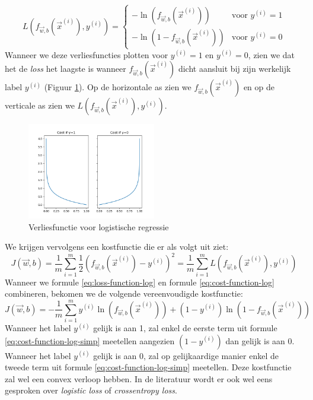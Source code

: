 \begin{equation}
 	L(f_{\vec{w},b}(\vec{x}^{(i)}), y^{(i)}) = \left\{ \begin{matrix} -\ln(f_{\vec{w},b}(\vec{x}^{(i)})) & \mbox{voor } y^{(i)} = 1 \\ -\ln(1 - f_{\vec{w},b}(\vec{x}^{(i)}))  & \mbox{voor } y^{(i)} = 0 \end{matrix}\right .
 	\label{eq:loss-function-log}
 \end{equation}
\noindent
Wanneer we deze verliesfuncties plotten voor $y^{(i)} = 1$ en $y^{(i)} = 0$, zien we dat het de \textit{loss} het laagste is wanneer $f_{\vec{w},b}(\vec{x}^{(i)})$ dicht aansluit bij zijn werkelijk label $y^{(i)}$ (Figuur \ref{fig:loss-function-log}). Op de horizontale as zien we $f_{\vec{w},b}(\vec{x}^{(i)})$ en op de verticale as zien we $L(f_{\vec{w},b}(\vec{x}^{(i)}), y^{(i)})$.

\begin{figure}[h]
	\centering
	\includegraphics[width=0.5\textwidth]{images/10-loss-function-log.png}
	\caption{Verliesfunctie voor logistische regressie}
	\label{fig:loss-function-log}
\end{figure}
\noindent
We krijgen vervolgens een kostfunctie die er als volgt uit ziet:
\begin{equation}
	J(\vec{w}, b) = \frac{1}{m} \sum_{i=1}^{m} \frac{1}{2}(f_{\vec{w},b}(\vec{x}^{(i)}) - y^{(i)})^{2} = \frac{1}{m} \sum_{i=1}^{m} L(f_{\vec{w},b}(\vec{x}^{(i)}), y^{(i)})
	\label{eq:cost-function-log}
\end{equation}
\noindent
Wanneer we formule \ref{eq:loss-function-log} en formule \ref{eq:cost-function-log} combineren, bekomen we de volgende vereenvoudigde kostfunctie:
\begin{equation}
	J(\vec{w}, b) = -\frac{1}{m} \sum_{i=1}^{m} y^{(i)}\ln(f_{\vec{w},b}(\vec{x}^{(i)})) + (1 - y^{(i)}) \ln(1 - f_{\vec{w},b}(\vec{x}^{(i)})) 
	\label{eq:cost-function-log-simp}
\end{equation}
\noindent
Wanneer het label $y^{(i)}$ gelijk is aan 1, zal enkel de eerste term uit formule \ref{eq:cost-function-log-simp} meetellen aangezien $(1 - y^{(i)})$ dan gelijk is aan 0. Wanneer het label $y^{(i)}$ gelijk is aan 0, zal op gelijkaardige manier enkel de tweede term uit formule \ref{eq:cost-function-log-simp} meetellen. Deze kostfunctie zal wel een convex verloop hebben. In de literatuur wordt er ook wel eens gesproken over \textit{logistic loss} of \textit{crossentropy loss}.

